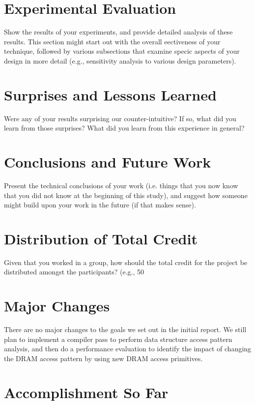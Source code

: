 \documentclass[letterpaper]{article}
\begin{document}
\section{Experimental Evaluation}
Show  the  results  of  your  experiments,  and  provide  detailed
analysis of these results.  This section might start out with the overall eectiveness of your
technique,  followed  by  various  subsections  that  examine  specic  aspects  of  your  design  in
more detail (e.g., sensitivity analysis to various design parameters).

\section{Surprises and Lessons Learned}
Were any of your results surprising our counter-intuitive?
If so, what did you learn from those surprises?  What did you learn from this experience in
general?

\section{Conclusions and Future Work}
Present the technical conclusions of your work (i.e. things
that you now know that you did not know at the beginning of this study), and suggest how
someone might build upon your work in the future (if that makes sense).

\section{Distribution of Total Credit}
Given that you worked in a group, how should the total credit
for the project be distributed amongst the participants?  (e.g., 50%

\section{Major Changes}

There are no major changes to the goals we set out in the initial report.
We still plan to implement a compiler pass to perform data structure access pattern analysis, and
then do a performance evaluation to identify the impact of changing the DRAM
access pattern by using new DRAM access primitives.

\section{Accomplishment So Far}
\end{document}
